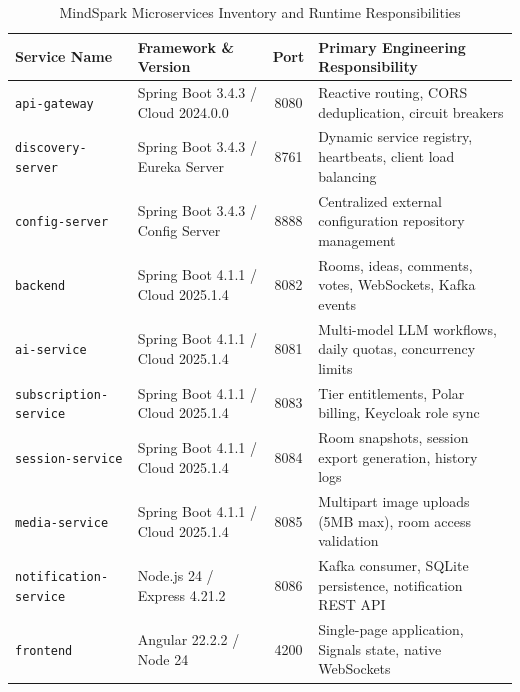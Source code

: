 \begin{table}[H]
\centering
\caption{MindSpark Microservices Inventory and Runtime Responsibilities}
\label{tab:microservices_inventory}
\small
\begin{tabularx}{\textwidth}{@{}l>{\raggedright}p{4.0cm}c>{\raggedright\arraybackslash}X@{}}
\toprule
\textbf{Service Name} & \textbf{Framework \& Version} & \textbf{Port} & \textbf{Primary Engineering Responsibility} \\
\midrule
\texttt{api-gateway} & Spring Boot 3.4.3 / Cloud 2024.0.0 & 8080 & Reactive routing, CORS deduplication, circuit breakers \\
\texttt{discovery-server} & Spring Boot 3.4.3 / Eureka Server & 8761 & Dynamic service registry, heartbeats, client load balancing \\
\texttt{config-server} & Spring Boot 3.4.3 / Config Server & 8888 & Centralized external configuration repository management \\
\texttt{backend} & Spring Boot 4.1.1 / Cloud 2025.1.4 & 8082 & Rooms, ideas, comments, votes, WebSockets, Kafka events \\
\texttt{ai-service} & Spring Boot 4.1.1 / Cloud 2025.1.4 & 8081 & Multi-model LLM workflows, daily quotas, concurrency limits \\
\texttt{subscription-service} & Spring Boot 4.1.1 / Cloud 2025.1.4 & 8083 & Tier entitlements, Polar billing, Keycloak role sync \\
\texttt{session-service} & Spring Boot 4.1.1 / Cloud 2025.1.4 & 8084 & Room snapshots, session export generation, history logs \\
\texttt{media-service} & Spring Boot 4.1.1 / Cloud 2025.1.4 & 8085 & Multipart image uploads (5MB max), room access validation \\
\texttt{notification-service} & Node.js 24 / Express 4.21.2 & 8086 & Kafka consumer, SQLite persistence, notification REST API \\
\texttt{frontend} & Angular 22.2.2 / Node 24 & 4200 & Single-page application, Signals state, native WebSockets \\
\bottomrule
\end{tabularx}
\end{table}

